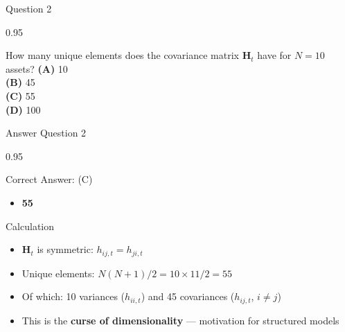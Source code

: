 \documentclass[9pt, aspectratio=169, t]{beamer}
\begin{document}
\begin{frame}{Question 2}
    \begin{cminipage}{0.95\textwidth}
    \begin{block}{How many unique elements does the covariance matrix $\mathbf{H}_t$ have for $N = 10$ assets?}
        \textcolor{MainBlue}{\textbf{(A)}} 10\\[3pt]
        \textcolor{MainBlue}{\textbf{(B)}} 45\\[3pt]
        \textcolor{MainBlue}{\textbf{(C)}} 55\\[3pt]
        \textcolor{MainBlue}{\textbf{(D)}} 100
    \end{block}
    \end{cminipage}
\end{frame}

\begin{frame}{Answer Question 2}
    \begin{cminipage}{0.95\textwidth}
    \begin{exampleblock}{Correct Answer: (C)}
        \begin{itemize}\setlength{\itemsep}{0pt}
            \item \textbf{55}
        \end{itemize}
    \end{exampleblock}

    \pause
    \begin{block}{Calculation}
        \begin{itemize}\setlength{\itemsep}{0pt}
            \item $\mathbf{H}_t$ is symmetric: $h_{ij,t} = h_{ji,t}$
            \item Unique elements: $N(N+1)/2 = 10 \times 11/2 = 55$
            \item Of which: 10 variances ($h_{ii,t}$) and 45 covariances ($h_{ij,t}$, $i \neq j$)
            \item This is the \textbf{curse of dimensionality} --- motivation for structured models
        \end{itemize}
    \end{block}
    \end{cminipage}
\end{frame}
\end{document}
